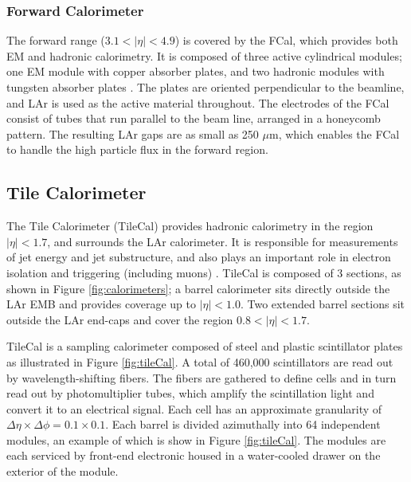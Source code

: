\subsubsection{Forward Calorimeter}
The forward range ($3.1 < |\eta| < 4.9$) is covered by the FCal, which provides both EM and hadronic calorimetry. It is composed of three active cylindrical modules; one EM module with copper absorber plates, and two hadronic modules with tungsten absorber plates \cite{lar_tdr}. The plates are oriented perpendicular to the beamline, and LAr is used as the active material throughout. The electrodes of the FCal consist of tubes that run parallel to the beam line, arranged in a honeycomb pattern. The resulting LAr gaps are as small as 250 $\mu$m, which enables the FCal to handle the high particle flux in the forward region. 

\subsection{Tile Calorimeter}
The Tile Calorimeter (TileCal) provides hadronic calorimetry in the region $|\eta| < 1.7$, and surrounds the LAr calorimeter. It is responsible for measurements of jet energy and jet substructure, and also plays an important role in electron isolation and triggering (including muons) \cite{tile_tdr}. TileCal is composed of 3 sections, as shown in Figure \ref{fig:calorimeters}; a barrel calorimeter sits directly outside the LAr EMB and provides coverage up to $|\eta| < 1.0$. Two extended barrel sections sit outside the LAr end-caps and cover the region $0.8 < |\eta| < 1.7$. \par

TileCal is a sampling calorimeter composed of steel and plastic scintillator plates as illustrated in Figure \ref{fig:tileCal}. A total of 460,000 scintillators are read out by wavelength-shifting fibers. The fibers are gathered to define cells and in turn read out by photomultiplier tubes, which amplify the scintillation light and convert it to an electrical signal. Each cell has an approximate granularity of $\Delta\eta \times \Delta\phi = 0.1 \times 0.1$. Each barrel is divided azimuthally into 64 independent modules, an example of which is show in Figure \ref{fig:tileCal}. The modules are each serviced by front-end electronic housed in a water-cooled drawer on the exterior of the module. \par

